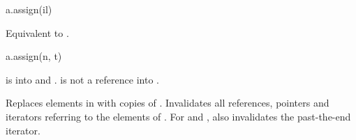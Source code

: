 \begin{itemdecl}
a.assign(il)
\end{itemdecl}

\begin{itemdescr}
\pnum
\effects
Equivalent to .
\end{itemdescr}

\begin{itemdecl}
a.assign(n, t)
\end{itemdecl}

\begin{itemdescr}
\pnum
\result
{}

\pnum
\expects
{} is  into 
and .
 is not a reference into .

\pnum
\effects
Replaces elements in  with  copies of .
Invalidates all references, pointers and iterators
referring to the elements of .
For  and ,
also invalidates the past-the-end iterator.
\end{itemdescr}

